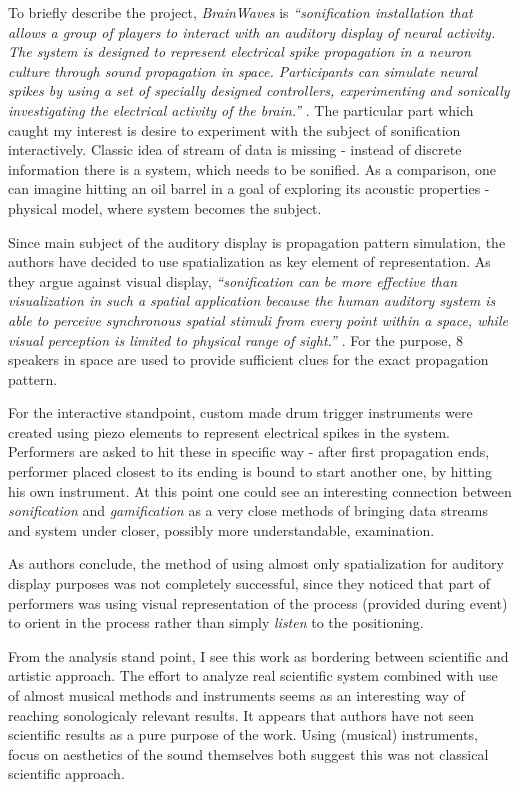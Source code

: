 \documentclass[12pt,a4paper,oneside]{report}
\begin{document}
To briefly describe the project, \emph{BrainWaves} is \emph{``sonification installation that allows a group of players to interact with an auditory display of neural activity. The system is designed to represent electrical spike propagation in a neuron culture through sound propagation in space. Participants can simulate neural spikes by using a set of specially designed controllers, experimenting and sonically investigating the electrical activity of the brain.''} \cite[p.~9]{Weinberg2006}. The particular part which caught my interest is desire to experiment with the subject of sonification interactively. Classic idea of stream of data is missing - instead of discrete information there is a system, which needs to be sonified. As a comparison, one can imagine hitting an oil barrel in a goal of exploring its acoustic properties - physical model, where system becomes the subject.

Since main subject of the auditory display is propagation pattern simulation, the authors have decided to use spatialization as key element of representation. As they argue against visual display, \emph{``sonification can be more effective than visualization in such a spatial application because the human auditory system is able to perceive synchronous spatial stimuli from every point within a space, while visual perception is limited to physical range of sight.''} \cite[p.~9]{Weinberg2006}. For the purpose, 8 speakers in space are used to provide sufficient clues for the exact propagation pattern.

For the interactive standpoint, custom made drum trigger instruments were created using piezo elements to represent electrical spikes in the system. Performers are asked to hit these in specific way - after first propagation ends, performer placed closest to its ending is bound to start another one, by hitting his own instrument. At this point one could see an interesting connection between \emph{sonification} and \emph{gamification} as a very close methods of bringing data streams and system under closer, possibly more understandable, examination.

As authors conclude, the method of using almost only spatialization for auditory display purposes was not completely successful, since they noticed that part of performers was using visual representation of the process (provided during event) to orient in the process rather than simply \emph{listen} to the positioning. 

From the analysis stand point, I see this work as bordering between scientific and artistic approach. The effort to analyze real scientific system combined with use of almost musical methods and instruments seems as an interesting way of reaching sonologicaly relevant results. It appears that authors have not seen scientific results as a pure purpose of the work. Using (musical) instruments, focus on aesthetics of the sound themselves both suggest this was not classical scientific approach.
\end{document}
